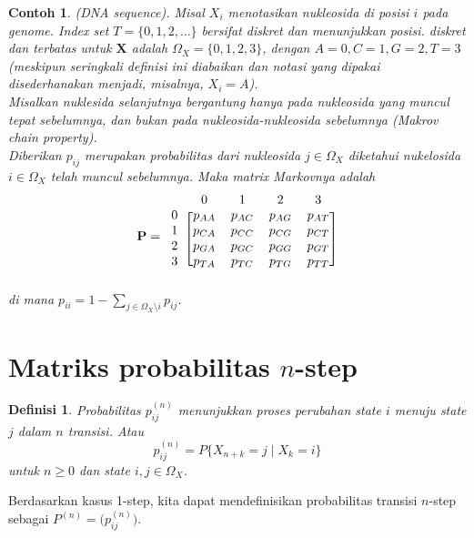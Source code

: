 \documentclass[11pt,b5paper,twoside]{book}
\newcommand{\bX}{\boldsymbol{X}}
\newtheorem{definition}[theorem]{Definisi}
\newtheorem{ex}[theorem]{Contoh}
\begin{document}
	\begin{ex} (DNA sequence). \label{DNAseq} 
		Misal $X_i$ menotasikan nukleosida di posisi $i$ pada genome. \textit{Index set} $T=\{0,1,2,\dots\} $ bersifat diskret dan menunjukkan posisi.  diskret dan terbatas untuk $\bX$ adalah $\Omega_X = \{0,1,2,3\}$, dengan $A=0, C= 1, G=2, T=3$ (meskipun seringkali definisi ini diabaikan dan notasi yang dipakai disederhanakan menjadi, misalnya, $X_i = A$).\\
		Misalkan nuklesida selanjutnya bergantung hanya pada nukleosida yang muncul tepat sebelumnya, dan bukan pada nukleosida-nukleosida sebelumnya (\textit{Makrov chain property}).\\
		Diberikan $p_{ij}$ merupakan probabilitas dari nukleosida $j \in \Omega_X$ diketahui nukelosida $i \in \Omega_X$ telah muncul sebelumnya. Maka matrix Markovnya adalah
		\[
		\mathbf{P}= 
		\begin{blockarray}{l *{4}{c}}
		&0 & 1 & 2 & 3  \\
		\begin{block}{c[cccc]}
		0& p_{AA} & p_{AC} & p_{AG} & p_{AT}  \\
		1& p_{CA} & p_{CC} & p_{CG} &p_{CT}\\
		2 & p_{GA} & p_{GC} & p_{GG} & p_{GT}  \\
		3 & p_{TA} & p_{TC} & p_{TG} & p_{TT} \\
		\end{block}
		\end{blockarray}
		\]
		di mana $p_{ii} = 1 - \sum_{j \in \Omega_X \setminus i} p_{ij}$.
	\end{ex}
	
	
	\section{Matriks probabilitas $n$-step} %
	
	\begin{definition}
		Probabilitas $p_{ij}^{(n)}$ menunjukkan proses perubahan state $i$ menuju state $j$  dalam $n$ transisi. Atau
		\begin{equation}
		p_{ij}^{(n)} = P\{ X_{n+k} = j \mid X_k = i\}
		\end{equation} 
		untuk $n \geq 0$ dan state $i,j \in \Omega_X$.
	\end{definition}
	Berdasarkan kasus 1-step, kita dapat mendefinisikan probabilitas transisi $n$-step sebagai $P^{(n)} = \big(p_{ij}^{(n)}\big)$.
	
\end{document}
